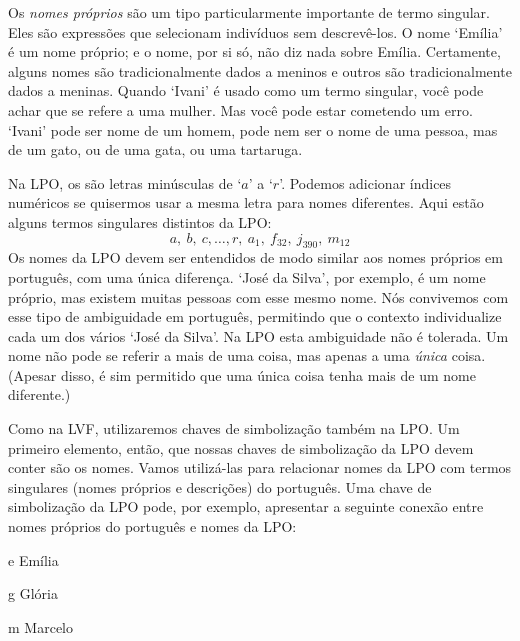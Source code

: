 Os \emph{nomes próprios} são um tipo particularmente importante de termo singular.
Eles são expressões que selecionam indivíduos sem descrevê-los.
O nome `Emília' é um nome próprio; e o nome, por si só, não diz nada sobre Emília.
Certamente, alguns nomes são tradicionalmente dados a meninos e outros são tradicionalmente dados a meninas.
Quando `Ivani' é usado como um termo singular, você pode achar que se refere a uma mulher.
Mas você pode estar cometendo um erro.
`Ivani' pode ser nome de um homem, pode nem ser o nome de uma pessoa, mas de um gato, ou de uma gata, ou uma tartaruga.

Na LPO, os  são letras minúsculas de `$a$' a `$r$'.
Podemos adicionar índices numéricos se quisermos usar a mesma letra para nomes diferentes.
Aqui estão alguns termos singulares distintos da LPO:
	$$a,\ b,\ c,\ldots, r, \ a_1, \ f_{32}, \ j_{390}, \ m_{12}$$
Os nomes da LPO devem ser entendidos de modo similar aos nomes próprios em português, com uma única diferença.
`José da Silva', por exemplo, é um nome próprio, mas existem muitas pessoas com esse mesmo nome.
Nós convivemos com esse tipo de ambiguidade em português, permitindo que o contexto individualize cada um dos vários `José da Silva'.
Na LPO esta ambiguidade não é tolerada.
Um nome não pode se referir a mais de uma coisa, mas apenas a uma \emph{única} coisa.
(Apesar disso, é sim permitido que uma única coisa tenha mais de um nome diferente.)

Como na LVF, utilizaremos chaves de simbolização também na LPO.
Um primeiro elemento, então, que nossas chaves de simbolização da LPO devem conter são os nomes.
Vamos utilizá-las para relacionar nomes da LPO com termos singulares (nomes próprios e descrições) do português.
Uma chave de simbolização da LPO pode, por exemplo, apresentar a seguinte conexão entre nomes próprios do português e nomes da LPO:
	\begin{ekey}
		\item[e] Emília
		\item[g] Glória
		\item[m] Marcelo
	\end{ekey}


